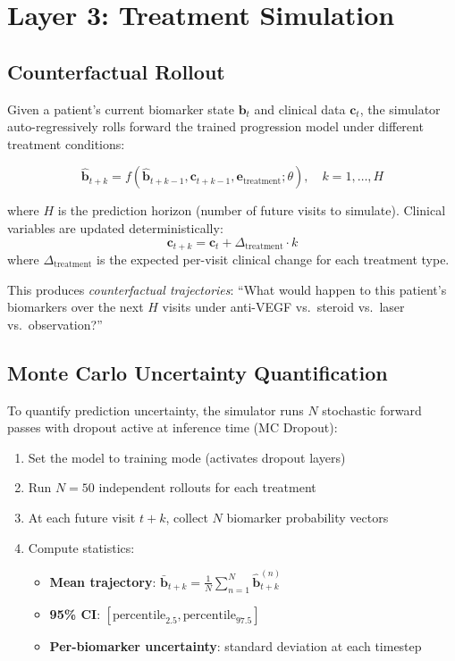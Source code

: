 \documentclass[12pt,a4paper]{article}
\begin{document}
\section{Layer 3: Treatment Simulation}

\subsection{Counterfactual Rollout}

Given a patient's current biomarker state $\mathbf{b}_t$ and clinical data $\mathbf{c}_t$, the simulator auto-regressively rolls forward the trained progression model under different treatment conditions:

\begin{equation}
\hat{\mathbf{b}}_{t+k} = f(\hat{\mathbf{b}}_{t+k-1}, \mathbf{c}_{t+k-1}, \mathbf{e}_{\text{treatment}}; \theta), \quad k = 1, \ldots, H
\end{equation}

where $H$ is the prediction horizon (number of future visits to simulate). Clinical variables are updated deterministically:
\begin{equation}
\mathbf{c}_{t+k} = \mathbf{c}_t + \Delta_{\text{treatment}} \cdot k
\end{equation}
where $\Delta_{\text{treatment}}$ is the expected per-visit clinical change for each treatment type.

This produces \emph{counterfactual trajectories}: ``What would happen to this patient's biomarkers over the next $H$ visits under anti-VEGF vs.\ steroid vs.\ laser vs.\ observation?''

\subsection{Monte Carlo Uncertainty Quantification}

To quantify prediction uncertainty, the simulator runs $N$ stochastic forward passes with dropout active at inference time (MC Dropout):

\begin{enumerate}[nosep]
  \item Set the model to training mode (activates dropout layers)
  \item Run $N=50$ independent rollouts for each treatment
  \item At each future visit $t+k$, collect $N$ biomarker probability vectors
  \item Compute statistics:
    \begin{itemize}[nosep]
      \item \textbf{Mean trajectory}: $\bar{\mathbf{b}}_{t+k} = \frac{1}{N}\sum_{n=1}^{N} \hat{\mathbf{b}}_{t+k}^{(n)}$
      \item \textbf{95\% CI}: $[\text{percentile}_{2.5}, \text{percentile}_{97.5}]$
      \item \textbf{Per-biomarker uncertainty}: standard deviation at each timestep
    \end{itemize}
\end{enumerate}
\end{document}
